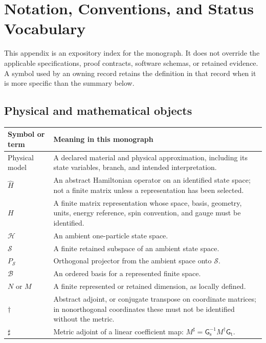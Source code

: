 \chapter{Notation, Conventions, and Status Vocabulary}

\label{app:notation-and-status}

This appendix is an expository index for the monograph. It does not override the
applicable specifications, proof contracts, software schemas, or retained
evidence. A symbol used by an owning record retains the definition in that
record when it is more specific than the summary below.

\section{Physical and mathematical objects}


\begin{center}
\small
\begin{tabular}{@{}p{}p{}@{}}
\toprule
Symbol or term & Meaning in this monograph \\
\midrule
Physical model & A declared material and physical approximation, including its
state variables, branch, and intended interpretation. \\
$\widehat H$ & An abstract Hamiltonian operator on an identified state space;
not a finite matrix unless a representation has been selected. \\
$H$ & A finite matrix representation whose space, basis, geometry, units,
energy reference, spin convention, and gauge must be identified. \\
$\mathcal H$ & An ambient one-particle state space. \\
$\mathcal S$ & A finite retained subspace of an ambient state space. \\
$P_{\mathcal S}$ & Orthogonal projector from the ambient space onto
$\mathcal S$. \\
$\mathcal B$ & An ordered basis for a represented finite space. \\
$N$ or $M$ & A finite represented or retained dimension, as locally defined. \\
$\dagger$ & Abstract adjoint, or conjugate transpose on coordinate matrices;
in nonorthogonal coordinates these must not be identified without the metric. \\
$\sharp$ & Metric adjoint of a linear coefficient map:
$M^{\sharp}=\mathsf G_{\mathrm s}^{-1}M^{\dagger}\mathsf G_{\mathrm t}$. \\
\bottomrule
\end{tabular}
\end{center}

